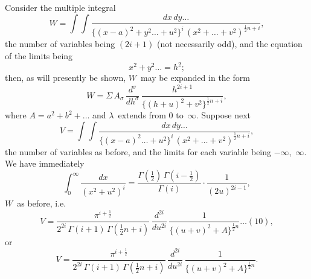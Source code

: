 \documentclass[11pt,a4paper]{article}
\begin{document}
Consider the multiple integral
\[
W = \int\!\!\int \frac{dx\,dy\ldots}{\{(x-a)^2 + y^2\ldots + u^2\}^i \, (x^2 + \ldots + v^2)^{\frac{1}{2}n+i}},
\]
the number of variables being $(2i+1)$ (not necessarily odd), and the equation of the limits being
\[
x^2 + y^2\ldots = h^2;
\]
then, as will presently be shown, $W$~may be expanded in the form
\[
W = \Sigma \, A_\sigma \, \frac{d^\sigma}{dh^\sigma} \, \frac{h^{2i+1}}{\{(h+u)^2 + v^2\}^{\frac{1}{2}n+i}},
\]
where $A = a^2 + b^2 + \ldots$ and $\lambda$~extends from $0$ to~$\infty$. Suppose next
\[
V = \int\!\!\int \frac{dx\,dy\ldots}{\{(x-a)^2\ldots + u^2\}^i \, (x^2 + \ldots + v^2)^{\frac{1}{2}n+i}},
\]
the number of variables as before, and the limits for each variable being $-\infty$,~$\infty$. We have immediately
\[
\int_0^\infty \frac{dx}{(x^2+u^2)^i} = \frac{\Gamma(\frac{1}{2})\,\Gamma(i-\frac{1}{2})}{\Gamma(i)} \cdot \frac{1}{(2u)^{2i-1}},
\]
$W$~as before, i.e.
\[
V = \frac{\pi^{i+\frac{1}{2}}}{2^{2i}\,\Gamma(i+1)\,\Gamma(\frac{1}{2}n+i)} \, \frac{d^{2i}}{du^{2i}} \, \frac{1}{\{(u+v)^2 + A\}^{\frac{1}{2}n}} \ldots(10),
\]
or
\[
V = \frac{\pi^{i+\frac{1}{2}}}{2^{2i}\,\Gamma(i+1)\,\Gamma(\frac{1}{2}n+i)} \, \frac{d^{2i}}{du^{2i}} \, \frac{1}{\{(u+v)^2 + A\}^{\frac{1}{2}n}}.
\]
\end{document}
